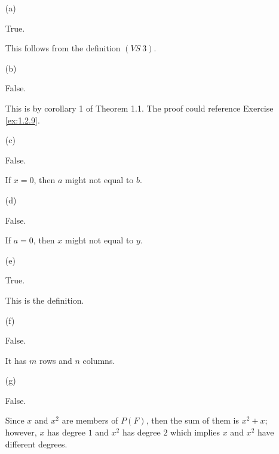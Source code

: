 \begin{Exercise}
	\begin{enumerate}[(a)]
		\item [(a)]
		\begin{answer}
			True.
		\end{answer}
		\begin{solution}
			This follows from the definition $(VS\ 3)$.
		\end{solution}
		
		\item [(b)]
		\begin{answer}
			False.
		\end{answer}
		\begin{solution}
			This is by corollary 1 of Theorem 1.1. The proof could reference Exercise \ref{ex:1.2.9}.
		\end{solution}
		
		\item [(c)]
		\begin{answer}
			False.
		\end{answer}
		\begin{solution}
			If $x = 0$, then $a$ might not equal to $b$.
		\end{solution}
		
		\item [(d)]
		\begin{answer}
			False.
		\end{answer}
		\begin{solution}
			If $a = 0$, then $x$ might not equal to $y$.
		\end{solution}
		
		\item [(e)]
		\begin{answer}
			True.
		\end{answer}
		\begin{solution}
			This is the definition.
		\end{solution}
		
		\item [(f)]
		\begin{answer}
			False.
		\end{answer}
		\begin{solution}
			It has $m$ rows and $n$ columns.
		\end{solution}
		
		\item [(g)]
		\begin{answer}
			False.
		\end{answer}
		\begin{solution}
			Since $x$ and $x^2$ are members of $P(F)$, then the sum of them is $x^2+x$; however, $x$ has degree $1$ and $x^2$ has degree $2$ which implies $x$ and $x^2$ have different degrees.
		\end{solution}
		

\end{enumerate}
\end{Exercise}
